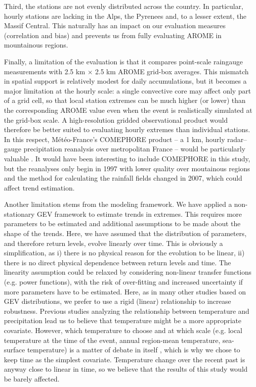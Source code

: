 \documentclass[french,a4paper,DIV=11,numbers=noendperiod]{scrartcl}
\begin{document}
Third, the stations are not evenly distributed across the country. In particular, hourly stations are lacking in the Alps, the Pyrenees and, to a lesser extent, the Massif Central. This naturally has an impact on our evaluation measures (correlation and bias) and prevents us from fully evaluating AROME in mountainous regions.

Finally, a limitation of the evaluation is that it compares point-scale raingauge measurements with 2.5 km × 2.5 km AROME grid-box averages. This mismatch in spatial support is relatively modest for daily accumulations, but it becomes a major limitation at the hourly scale: a single convective core may affect only part of a grid cell, so that local station extremes can be much higher (or lower) than the corresponding AROME value even when the event is realistically simulated at the grid-box scale. A high-resolution gridded observational product would therefore be better suited to evaluating hourly extremes than individual stations. In this respect, Météo-France’s COMEPHORE product – a 1 km, hourly radar–gauge precipitation reanalysis over metropolitan France – would be particularly valuable \parencite{MeteoFrance_COMEPHORE_dataGouv}. It would have been interesting to include COMEPHORE in this study, but the reanalyses only begin in 1997 with lower quality over moutainous regions \parencite{Fumiere2020} and the method for calculating the rainfall fields changed in 2007, which could affect trend estimation.


Another limitation stems from the modeling framework. We have applied a non-stationary GEV framework to estimate trends in extremes. This requires more parameters to be estimated and additional assumptions to be made about the shape of the trends. Here, we have assumed that the distribution of parameters, and therefore return levels, evolve linearly over time. This is obviously a simplification, as i) there is no physical reason for the evolution to be linear, ii) there is no direct physical dependence between return levels and time. The linearity assumption could be relaxed by considering non-linear transfer functions (e.g. power functions), with the risk of over-fitting and increased uncertainty if more parameters have to be estimated. Here, as in many other studies based on GEV distributions, we prefer to use a rigid (linear) relationship to increase robustness. Previous studies analyzing the relationship between temperature and precipitation \parencite{DaSilva2025} lead us to believe that temperature might be a more appropriate covariate.
However, which temperature to choose and at which scale (e.g. local temperature at the time of the event, annual region-mean temperature, sea-surface temperature)  is a matter of debate in itself \parencite{Schroeer2018, Dash2023, Zeder2020}, which is why we chose to keep time as the simplest covariate. Temperature change over the recent past is anyway close to linear in time, so we believe that the results of this study would be barely affected.
\end{document}
